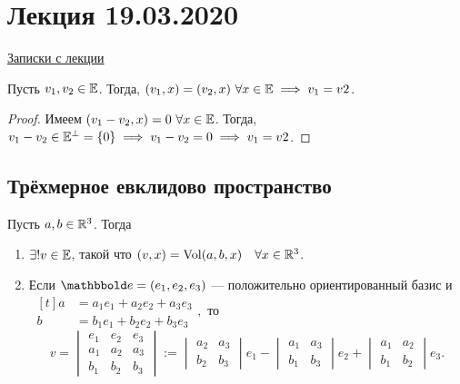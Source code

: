 \section{Лекция 19.03.2020} 

\href{https://www.dropbox.com/s/y3r4x7mjt7iv71a/%D0%9B%D0%90%D0%B8%D0%93_19-20_%D0%9B%D0%B5%D0%BA%D1%86%D0%B8%D1%8F_25.pdf?dl=0}{Записки с лекции}


\begin{lemma}
    Пусть $v_1, v_2 \in \mathbb{E}$. Тогда, $(v_1, x) = (v_2, x) \ \forall x \in \mathbb{E} \implies v_1 = v2$.
\end{lemma}

\begin{proof}
    Имеем $(v_1 - v_2, x) = 0 \ \forall x \in \EE$.
    Тогда, $v_1 - v_2 \in \mathbb{E}^{\perp} = \{0\} \implies v_1 - v_2 = 0 \implies v_1 = v2$.
\end{proof}


\subsection{Трёхмерное евклидово пространство}

\begin{theorem}
    \label{lec25:t}
    Пусть $a, b \in \mathbb{R}^3$. Тогда
    \begin{enumerate}
    \item $\exists! v \in \mathbb{E}$, такой что $(v, x) = \operatorname{\mathop{\mathrm{Vol}}}(a, b, x) \quad \forall x \in \mathbb{R}^3$.
    \item Если $\E = (e_1, e_2, e_3)$ --- положительно ориентированный базис и
        \begin{math}
            \ \begin{aligned}[t]
                a &= a_1 e_1 + a_2 e_2 + a_3 e_3 \\
                b &= b_1 e_1 + b_2 e_2 + b_3 e_3
            \end{aligned},
        \end{math}
        то 
        \begin{equation}
            \tag{$\star$}
            \label{lec25:v}
            v = \begin{vmatrix}
                e_1 & e_2 & e_3 \\
                a_1 & a_2 & a_3 \\
                b_1 & b_2 & b_3
            \end{vmatrix}
            := \begin{vmatrix} 
                a_2 & a_3 \\
                b_2 & b_3
            \end{vmatrix} e_1 - \begin{vmatrix} 
                a_1 & a_3 \\
                b_1 & b_3
            \end{vmatrix} e_2 + \begin{vmatrix} 
                a_1 & a_2 \\
                b_1 & b_2
            \end{vmatrix} e_3
        .\end{equation}
    \end{enumerate}
\end{theorem}

